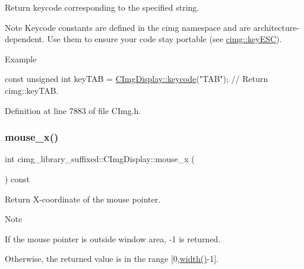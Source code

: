 Return keycode corresponding to the specified string. 

\begin{DoxyNote}{Note}
Keycode constants are defined in the cimg namespace and are architecture-\/dependent. Use them to ensure your code stay portable (see \hyperlink{namespacecimg__library__suffixed_1_1cimg_abaabb7beac6bae90502bd8378f7037f9}{cimg\+::key\+E\+SC}). 
\end{DoxyNote}
\begin{DoxyParagraph}{Example}

\begin{DoxyCode}
\textcolor{keyword}{const} \textcolor{keywordtype}{unsigned} \textcolor{keywordtype}{int} keyTAB = \hyperlink{structcimg__library__suffixed_1_1CImgDisplay_a09c59cb4778b64e31884fccca321839b}{CImgDisplay::keycode}(\textcolor{stringliteral}{"TAB"});  \textcolor{comment}{// Return cimg::keyTAB.}
\end{DoxyCode}
 
\end{DoxyParagraph}


Definition at line 7883 of file C\+Img.\+h.

\mbox{\label{structcimg__library__suffixed_1_1CImgDisplay_aa70a8fffd122d505ff4e3a487c36786a}} 
\subsubsection{\texorpdfstring{mouse\+\_\+x()}{mouse\_x()}}
{\footnotesize\ttfamily int cimg\+\_\+library\+\_\+suffixed\+::\+C\+Img\+Display\+::mouse\+\_\+x (\begin{DoxyParamCaption}{ }\end{DoxyParamCaption}) const\hspace{0.3cm}{\ttfamily [inline]}}



Return X-\/coordinate of the mouse pointer. 

\begin{DoxyNote}{Note}

\begin{DoxyItemize}
\item If the mouse pointer is outside window area, {\ttfamily -\/1} is returned.
\item Otherwise, the returned value is in the range \mbox{[}0,\hyperlink{structcimg__library__suffixed_1_1CImgDisplay_a7b08f09ace9b615eee0ff19846c4b6f8}{width()}-\/1\mbox{]}. 
\end{DoxyItemize}
\end{DoxyNote}


